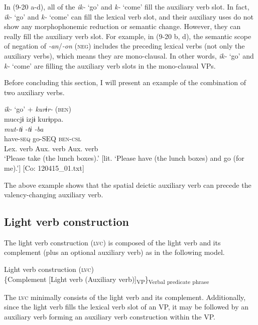 In (9-20 a-d), all of the \textit{ik-} ‘go’ and \textit{k-} ‘come’ fill the auxiliary verb slot. In fact, \textit{ik-} ‘go’ and \textit{k-} ‘come’ can fill the lexical verb slot, and their auxiliary uses do not show any morphophonemic reduction or semantic change. However, they can really fill the auxiliary verb slot. For example, in (9-20 b, d), the semantic scope of negation of \textit{{}-an}/\textit{{}-on} (\textsc{neg}) includes the preceding lexical verbs (not only the auxiliary verbs), which means they are mono-clausal. In other words, \textit{ik-} ‘go’ and \textit{k-} ‘come’ are filling the auxiliary verb slots in the mono-clausal VPs.

Before concluding this section, I will present an example of the combination of two auxiliary verbs.

\ea   \textit{ik-} ‘go’ + \textit{kurɨr-} (\textsc{ben}) \label{ex:9.21}\\
 \gllll  muccjɨ  izjɨ  kurɨppa.\\
    \textit{mut-tɨ}  \textit{-tɨ  -ba}\\
    have-\textsc{seq}  go-SEQ  \textsc{ben}-\textsc{csl}\\
    {Lex. verb}  {Aux. verb}  {Aux. verb}\\
    \glt     ‘Please take (the lunch boxes).’ [lit. ‘Please have (the lunch boxes) and go (for me).’] [Co: 120415\_01.txt]
\z

The above example shows that the spatial deictic auxiliary verb can precede the valency-changing auxiliary verb.

\subsection{Light verb construction}\label{sec:9.1.2}

The light verb construction (\textsc{lvc}) is composed of the light verb and its complement (plus an optional auxiliary verb) as in the following model.

\ea   Light verb construction (\textsc{lvc}) \label{ex:9.22}\\
  \{Complement \hspace{\tabcolsep} [Light verb \hspace{\tabcolsep} (Auxiliary verb)]\textsubscript{VP}\}\textsubscript{Verbal predicate phrase}
\z

The \textsc{lvc} minimally consists of the light verb and its complement. Additionally, since the light verb fills the lexical verb slot of an VP, it may be followed by an auxiliary verb forming an auxiliary verb construction within the VP.

